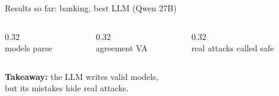 \documentclass[aspectratio=169,11pt]{beamer}
\begin{document}
\begin{frame}{Results so far: banking, best LLM (Qwen 27B)}
\centering
\begin{columns}[T,onlytextwidth]
\begin{column}{0.32\textwidth}\centering
{}\\[0.4em]
models parse\\
\end{column}
\begin{column}{0.32\textwidth}\centering
{}\\[0.4em]
agreement VA\\
\end{column}
\begin{column}{0.32\textwidth}\centering
{}\\[0.4em]
real attacks called safe\\
\end{column}
\end{columns}

\vspace{2.4em}
\large
\textbf{Takeaway:} the LLM writes valid models,\\ but its mistakes hide real attacks.
\end{frame}
\end{document}
